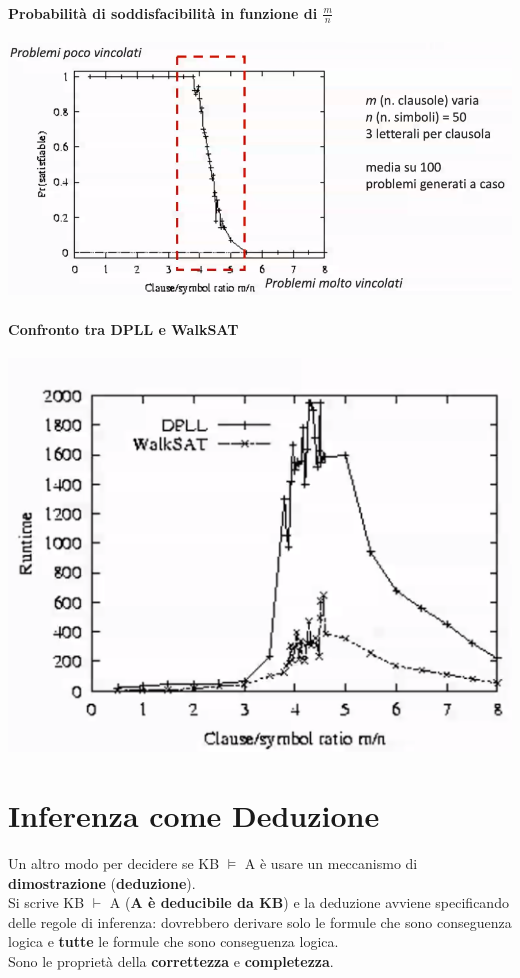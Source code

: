 \documentclass[10pt]{book}
\begin{document}
\paragraph{Probabilità di soddisfacibilità in funzione di $\frac{m}{n}$}
\begin{center}
	\includegraphics[scale=0.7]{sat_grafico.png}
\end{center}
\paragraph{Confronto tra DPLL e WalkSAT}
\begin{center}
	\includegraphics[scale=0.7]{dpllwalksat_confronto.png}
\end{center}
\section{Inferenza come Deduzione}
Un altro modo per decidere se KB $\vDash$ A è usare un meccanismo di \textbf{dimostrazione} (\textbf{deduzione}).\\
Si scrive KB $\vdash$ A (\textbf{A è deducibile da KB}) e la deduzione avviene specificando delle regole di inferenza: dovrebbero derivare solo le formule che sono conseguenza logica e \textbf{tutte} le formule che sono conseguenza logica.\\
Sono le proprietà della \textbf{correttezza} e \textbf{completezza}.
\end{document}
